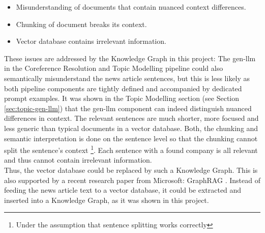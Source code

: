 \begin{itemize}
    \item Misunderstanding of documents that contain nuanced context differences.
    \item Chunking of document breaks its context.
    \item Vector database contains irrelevant information.
\end{itemize}

These issues are addressed by the Knowledge Graph in this project:
The \gls{gen-llm} in the Coreference Resolution and Topic Modelling pipeline could also semantically misunderstand the news article sentences,
but this is less likely as both pipeline components are tightly defined and accompanied by dedicated \gls{prompt} examples.
It was shown in the Topic Modelling section (see Section \ref{sec:topic-gen-llm}) that the \gls{gen-llm} component can indeed distinguish nuanced differences in context.
The relevant sentences are much shorter, more focused and less generic than typical documents in a vector database.
Both, the chunking and semantic interpretation is done on the sentence level so that the chunking cannot split the sentence's context \footnote{Under the assumption that sentence splitting works correctly}.
Each sentence with a found company is all relevant and thus cannot contain irrelevant information.\\
Thus, the vector database could be replaced by such a Knowledge Graph.
This is also supported by a recent research paper from Microsoft: GraphRAG \cite{graphrag}.
Instead of feeding the news article text to a vector database, it could be extracted and inserted into a Knowledge Graph, as it was shown in this project.



